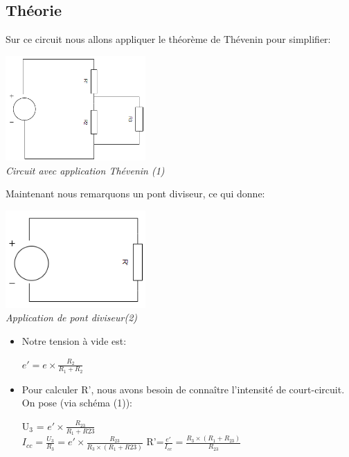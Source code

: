 \documentclass[a4paper,12pt,titlepage]{article}
\begin{document}
\subsection{Théorie}
Sur ce circuit nous allons appliquer le théorème de Thévenin pour simplifier:\\
\begin{center}
    \includegraphics[width=0.4\textwidth]{Exo4/Exo4-1.PNG}\\
    \textit{Circuit avec application Thévenin (1)}
\end{center}

Maintenant nous remarquons un pont diviseur, ce qui donne:

\begin{center}
    \includegraphics[width=0.4\textwidth]{Exo4/Exo4-2.PNG}\\
    \textit{Application de pont diviseur(2)}
\end{center}

\begin{itemize}
    \item Notre tension à vide est: 
        \begin{center}
            $e'=e\times\frac{R_2}{R_1+R_2}$
        \end{center}
    \item Pour calculer R', nous avons besoin de connaître l'intensité de court-circuit. On pose (via schéma (1)):
        \begin{center}
            U$_3$ = $e'\times\frac{R_{23}}{R_1+R23}$\\
            $I_{cc} = \frac{U_3}{R_3} = e'\times\frac{R_{23}}{R_3\times(R_1+R23)}$
            R'=$\frac{e'}{I_{cc}} = \frac{R_3\times(R_1+R_{23})}{R_{23}}$
        \end{center}
\end{itemize}
\end{document}

